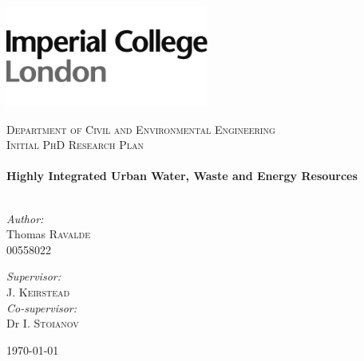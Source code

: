 \begin{titlepage}


\includegraphics[width=0.5\textwidth]{./img/ImperialLogo.jpg}\\[1cm]

\begin{center}

\textsc{\large Department of Civil and Environmental Engineering}\\[1.5cm]

\textsc{\Large Initial PhD Research Plan}\\[0.5cm]

\HRule \\[0.4cm]
{ \LARGE \bfseries Highly Integrated Urban Water, Waste and Energy Resources}\\[0.4cm]

\HRule \\[1.5cm]

\begin{minipage}{0.5\textwidth}
\begin{flushleft} \large
\emph{Author:}\\
Thomas \textsc{Ravalde}\\
00558022 \\
\end{flushleft}
\end{minipage}
\begin{minipage}{0.4\textwidth}
\begin{flushright} \large
\emph{Supervisor:} \\
J. \textsc{Keirstead} \\
\emph{Co-supervisor:} \\
Dr I. \textsc{Stoianov} \\
\end{flushright}
\end{minipage}

\vfill

{\today}

\end{center}

\end{titlepage}
